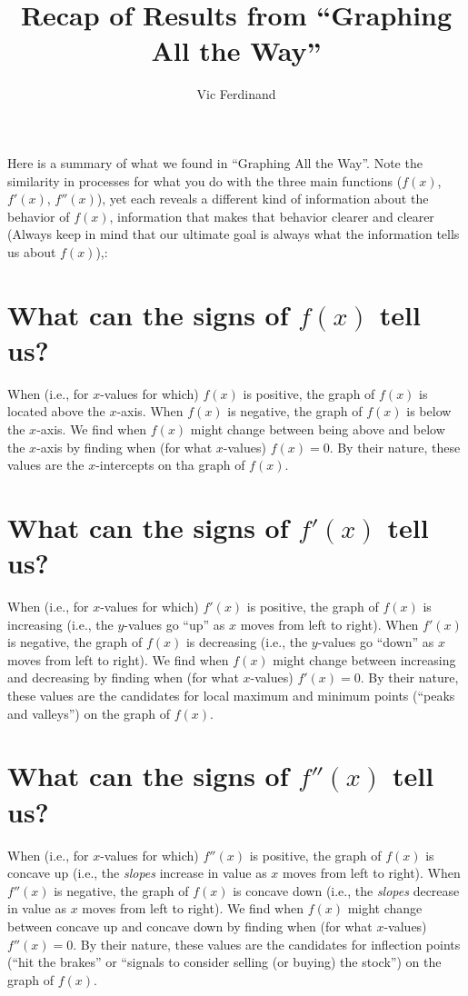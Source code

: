 \documentclass{ximera}
\author{Vic Ferdinand}
\title{Recap of Results from ``Graphing All the Way''}
\begin{document}
\begin{abstract}
\end{abstract}
\maketitle


Here is a summary of what we found in ``Graphing All the Way''.  Note the similarity in processes for what you do with the three main functions ($f(x)$, $f'(x)$, $f''(x)$), yet each reveals a different kind of information about the behavior of $f(x)$, information that makes that behavior clearer and clearer (Always keep in mind that our ultimate goal is always what the information tells us about $f(x)$),:

\section*{What can the signs of $f(x)$ tell us?}

When (i.e., for $x$-values for which) $f(x)$ is positive, the graph of $f(x)$ is located above the $x$-axis.  When $f(x)$ is negative, the graph of $f(x)$ is below the $x$-axis.  We find when $f(x)$ might change between being above and below the $x$-axis by finding when (for what $x$-values) $f(x) = 0$.  By their nature, these values are the $x$-intercepts on tha graph of $f(x)$.

\section*{What can the signs of $f'(x)$ tell us?}

When (i.e., for $x$-values for which) $f'(x)$ is positive, the graph of $f(x)$ is increasing (i.e., the $y$-values go ``up'' as $x$ moves from left to right).  When $f'(x)$ is negative, the graph of $f(x)$ is decreasing (i.e., the $y$-values go ``down'' as $x$ moves from left to right).  We find when $f(x)$ might change between increasing and decreasing by finding when (for what $x$-values) $f'(x) = 0$.  By their nature, these values are the candidates for local maximum and minimum points (``peaks and valleys'') on the graph of $f(x)$.

\section*{What can the signs of $f''(x)$ tell us?}

When (i.e., for $x$-values for which) $f''(x)$ is positive, the graph of $f(x)$ is concave up (i.e., the {\em slopes} increase in value as $x$ moves from left to right).  When $f''(x)$ is negative, the graph of $f(x)$ is concave down (i.e., the {\em slopes} decrease in value as $x$ moves from left to right).  We find when $f(x)$ might change between concave up and concave down by finding when (for what $x$-values) $f''(x) = 0$.  By their nature, these values are the candidates for inflection points (``hit the brakes'' or ``signals to consider selling (or buying) the stock'') on the graph of $f(x)$.
\end{document}
